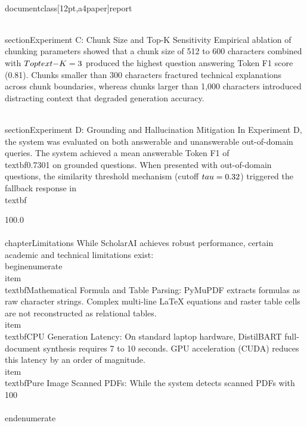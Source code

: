 \\documentclass[12pt,a4paper]{report}
\begin{document}
\\section{Experiment C: Chunk Size and Top-K Sensitivity}
Empirical ablation of chunking parameters showed that a chunk size of 512 to 600 characters combined with $Top\\text{-}K = 3$ produced the highest question answering Token F1 score (0.81). Chunks smaller than 300 characters fractured technical explanations across chunk boundaries, whereas chunks larger than 1,000 characters introduced distracting context that degraded generation accuracy.

\\section{Experiment D: Grounding and Hallucination Mitigation}
In Experiment D, the system was evaluated on both answerable and unanswerable out-of-domain queries. The system achieved a mean answerable Token F1 of \\textbf{0.7301} on grounded questions. When presented with out-of-domain questions, the similarity threshold mechanism (cutoff $\\tau = 0.32$) triggered the fallback response in \\textbf{100.0\\%

\\chapter{Limitations}
While ScholarAI achieves robust performance, certain academic and technical limitations exist:
\\begin{enumerate}
    \\item \\textbf{Mathematical Formula and Table Parsing:} PyMuPDF extracts formulas as raw character strings. Complex multi-line LaTeX equations and raster table cells are not reconstructed as relational tables.
    \\item \\textbf{CPU Generation Latency:} On standard laptop hardware, DistilBART full-document synthesis requires 7 to 10 seconds. GPU acceleration (CUDA) reduces this latency by an order of magnitude.
    \\item \\textbf{Pure Image Scanned PDFs:} While the system detects scanned PDFs with 100\\%
\\end{enumerate}

}
\end{document}
